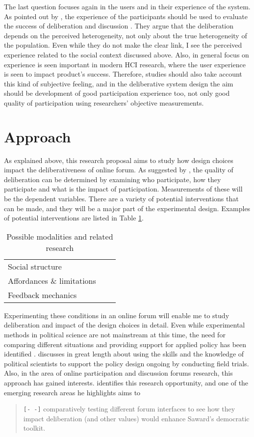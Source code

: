 \documentclass{article}
\begin{document}
The last question focuses again in the users and in their experience of the system. As pointed out by , the experience of the participants should be used to evaluate the success of deliberation and discussion . They argue that the deliberation depends on the perceived heterogeneity, not only about the true heterogeneity of the population. Even while they do not make the clear link, I see the perceived experience related to the social context discussed above. Also, in general focus on experience is seen important in modern HCI research, where the user experience is seen to impact product's success. Therefore, studies should also take account this kind of subjective feeling, and in the deliberative system design the aim should be development of good participation experience too, not only good quality of participation using researchers' objective measurements.

\section{Approach}

As explained above, this research proposal aims to study how design choices impact the deliberativeness of online forum. As suggested by , the quality of deliberation can be determined by examining who participate, how they participate and what is the impact of participation. Measurements of these will be the dependent variables. There are a variety of potential interventions that can be made, and they will be a major part of the experimental design. Examples of potential interventions are listed in Table \ref{tab:modalities}.

\begin{table}
\begin{tabular}{lc|l}
Social structure & & \cite{sukumaran11,underhill03} \\
Affordances \& limitations & & \cite{eklundh94,danet98,donath99} \\ 
Feedback mechanics & &
\end{tabular} 
\caption{Possible modalities and related research}
\label{tab:modalities}
\end{table}

Experimenting these conditions in an online forum will enable me to study deliberation and impact of the design choices in detail. Even while experimental methods in political science are not mainstream at this time, the need for comparing different situations and providing support for applied policy has been identified \cite{green03}.  discusses in great length about using the skills and the knowledge of political scientists to support the policy design ongoing by conducting field trials. Also, in the area of online participation and discussion forums research, this approach has gained interests.  identifies this research opportunity, and one of the emerging research areas he highlights aims to

\begin{quote}
\texttt{[- -]} comparatively testing different forum interfaces to see how they impact deliberation (and other values) would enhance Saward’s democratic toolkit.
\end{quote}


\newpage



\end{document}
